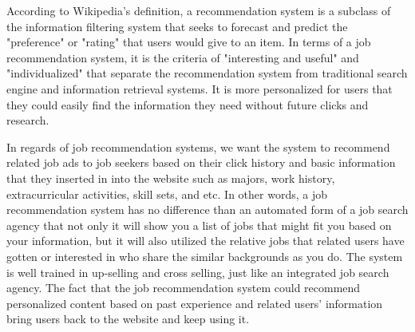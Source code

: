 \documentclass[sigconf]{acmart}
\begin{document}
\par According to Wikipedia's definition, a recommendation system  is a subclass of the information filtering system that seeks to forecast and predict the "preference" or "rating" that users would give to an item. In terms of a job recommendation system, it is the criteria of  "interesting and useful" and "individualized" that separate the recommendation system from traditional search engine and information retrieval systems.\cite{Zhou2017} It is more personalized for users that they could easily find the information they need without future clicks and research.

\par In regards of job recommendation systems, we want the system to recommend related job ads to job seekers based on their click history and basic information that they inserted in into the website such as majors, work history, extracurricular activities, skill sets, and etc.\cite{Standford} In other words, a job recommendation system has no difference than an automated form of a job search agency that not only it will show you a list of jobs that might fit you based on your information, but it will also utilized the relative jobs that related users have gotten or interested in who share the similar backgrounds as you do. The system is well trained in up-selling and cross selling, just like an integrated job search agency.\cite{Standford} The fact that the job recommendation system could recommend personalized content based on past experience and related users' information bring users back to the website and keep using it. 
\end{document}
